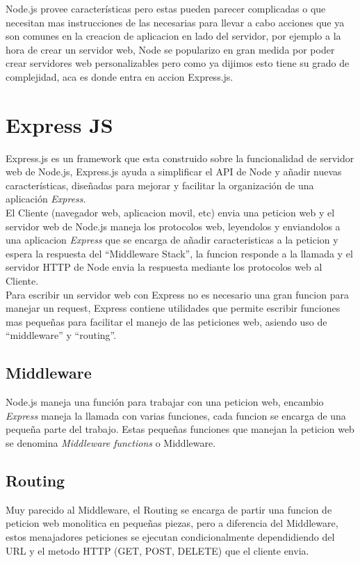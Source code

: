     Node.js provee caracter\'isticas pero estas pueden parecer complicadas o que necesitan mas instrucciones de las necesarias para llevar a cabo acciones que ya son comunes en la creacion de aplicacion en lado del servidor, por ejemplo a la hora de crear un servidor web, Node se popularizo en gran medida por poder crear servidores web personalizables pero como ya dijimos esto tiene su grado de complejidad, aca es donde entra en accion Express.js.

  \section{Express JS}
  \label{sec:express_js}
    Express.js es un framework que esta construido sobre la funcionalidad de servidor web de Node.js, Express.js ayuda a simplificar el API de Node y a\~nadir nuevas caracter\'isticas, dise\~nadas para mejorar y facilitar la organizaci\'on de una aplicaci\'on \emph{Express}.\\

    El Cliente (navegador web, aplicacion movil, etc) envia una peticion web y el servidor web de Node.js maneja los protocolos web, leyendolos y enviandolos a una aplicacion \emph{Express} que se encarga de a\~nadir caracteristicas a la peticion y espera la respuesta del ``Middleware Stack'', la funcion responde a la llamada y el servidor HTTP de Node envia la respuesta mediante los protocolos web al Cliente.\\

    Para escribir un servidor web con Express no es necesario una gran funcion para manejar un request, Express contiene utilidades que permite escribir funciones mas peque\~nas para facilitar el manejo de las peticiones web, asiendo uso de ``middleware'' y ``routing''.

    \subsection{Middleware}
    \label{sub:middleware}
      Node.js maneja una funci\'on para trabajar con una peticion web, encambio \emph{Express} maneja la llamada con varias funciones, cada funcion se encarga de una peque\~na parte del trabajo. Estas peque\~nas funciones que manejan la peticion web se denomina \emph{Middleware functions} o Middleware.


    \subsection{Routing}
    \label{sub:routing}
      Muy parecido al Middleware, el Routing se encarga de partir una funcion de peticion web monolitica en peque\~nas piezas, pero a diferencia del Middleware, estos menajadores peticiones se ejecutan condicionalmente dependidiendo del URL y el metodo HTTP (GET, POST, DELETE) que el cliente envia.\\

